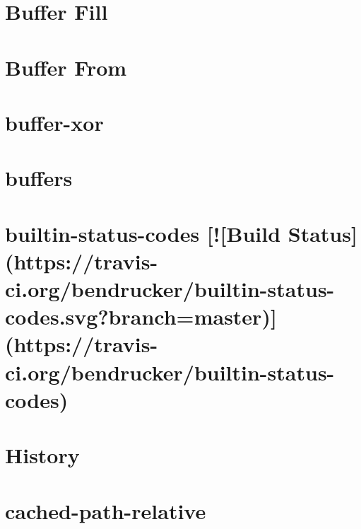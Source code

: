 \documentclass[twoside]{book}
\newcommand{\+}{\discretionary{\mbox{\scriptsize$\hookleftarrow$}}{}{}}
\begin{document}
\chapter{Buffer Fill}
\label{md_dsmacc_examples_DRmerge_node_modules_buffer-fill_readme}

\chapter{Buffer From}
\label{md_dsmacc_examples_DRmerge_node_modules_buffer-from_readme}

\chapter{buffer-\/xor}
\label{md_dsmacc_examples_DRmerge_node_modules_buffer-xor_README}

\chapter{buffers}
\label{md_dsmacc_examples_DRmerge_node_modules_buffers_README}

\chapter{builtin-\/status-\/codes \mbox{[}!\mbox{[}Build Status\mbox{]}(https\+://travis-\/ci.org/bendrucker/builtin-\/status-\/codes.svg?branch=master)\mbox{]}(https\+://travis-\/ci.org/bendrucker/builtin-\/status-\/codes)}
\label{md_dsmacc_examples_DRmerge_node_modules_builtin-status-codes_readme}

\chapter{History}
\label{md_dsmacc_examples_DRmerge_node_modules_cached-path-relative_History}

\chapter{cached-\/path-\/relative}
\label{md_dsmacc_examples_DRmerge_node_modules_cached-path-relative_Readme}

\end{document}
